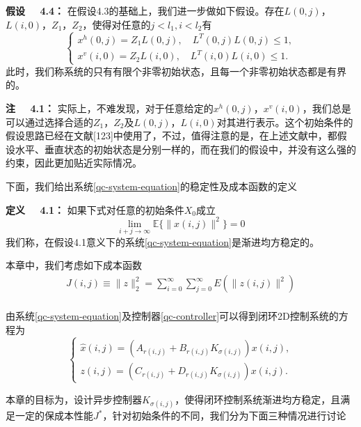 	{\bf 假设 \ \ 4.4：}
	在假设4.3的基础上，我们进一步做如下假设。存在$L(0,j)$，$L(i,0)$，$Z_1$，$Z_2$，使得对任意的$j<l_1,i<l_2$有
	\begin{equation}
		\left\{
		\begin{array}{lr}
		x^{h}(0,j)=Z_1L(0,j),\quad L^{T}(0,j)L(0,j)\leq 1,\\
		x^{v}(i,0)=Z_2L(i,0),\quad  L^{T}(i,0)L(i,0)\leq 1.
		\end{array}
		\right.
	\end{equation}
	此时，我们称系统的只有有限个非零初始状态，且每一个非零初始状态都是有界的。
	
	{\bf 注 \ \ 4.1：}
	实际上，不难发现，对于任意给定的$x^{h}(0,j)$，$x^{v}(i,0)$，我们总是可以通过选择合适的$Z_1$，$Z_2$及$L(0,j)$，$L(i,0)$对其进行表示。这个初始条件的假设思路已经在文献[123]中使用了，不过，值得注意的是，在上述文献中，都假设水平、垂直状态的初始状态是分别一样的，而在我们的假设中，并没有这么强的约束，因此更加贴近实际情况。
	
	下面，我们给出系统\eqref{qc-system-equation}的稳定性及成本函数的定义
	
	{\bf 定义 \ \ 4.1：}
	如果下式对任意的初始条件$X_{0}$成立
	\begin{equation}\label{qc-AMSS}
	\lim\limits_{i+j\to\infty}\mathbb{E}\{\|x(i,j)\|^{2}\} = 0
	\end{equation}
	我们称，在假设4.1意义下的系统\eqref{qc-system-equation}是渐进均方稳定的。
	
	本章中，我们考虑如下成本函数
	\begin{equation}\label{qccostfuntion}
	\begin{split}
	J(i,j) \equiv \|z\|_{2}^{2} = \sum_{i=0}^{\infty}\sum_{j=0}^{\infty}E(\|z(i,j)\|^{2})\\
	\end{split}
	\end{equation}
	
	由系统\eqref{qc-system-equation}及控制器\eqref{qc-controller}可以得到闭环2D控制系统的方程为
	\begin{equation}\label{qc-closed-system-equation}
		\left\{
			\begin{array}{lr}
				\hat{x}(i,j) = (A_{r(i,j)}+B_{r(i,j)}K_{\sigma(i,j)})x(i,j), \\
				z(i,j) = (C_{r(i,j)}+D_{r(i,j)}K_{\sigma(i,j)})x(i,j).
			\end{array}
		\right.
	\end{equation}
	
	本章的目标为，设计异步控制器$K_{\sigma(i,j)}$，使得闭环控制系统渐进均方稳定，且满足一定的保成本性能$J^{*}$，针对初始条件的不同，我们分为下面三种情况进行讨论
	
